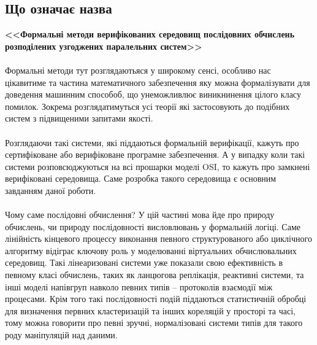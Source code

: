 \documentclass[11pt,oneside]{article}
\begin{document}
\subsection{Що означає назва}

   {\bf <<Формальні методи верифікованих середовищ послідовних
          обчислень розподілених узгоджених паралельних систем>>}

\vspace{0.5cm}

   \paragraph{}
   Формальні методи тут розглядаютьяся у широкому сенсі, особливо нас цікавитиме
   та частина математичного забезпечення яку можна формалізувати для доведення
   машинним способоб, що унеможливлює виникнинення цілого класу помилок.
   Зокрема розглядатимуться усі теорії які застосовують до подібних систем
   з підвищеними запитами якості.

   \paragraph{}
   Розглядаючи такі системи, які піддаються формальній верифікації, кажуть про
   сертифіковане або верифіковане програмне забезпечення. А у випадку коли такі
   системи розповсюджуються на всі прошарки моделі OSI, то кажуть про замкнені
   верифіковані середовища. Саме розробка такого середовища є основним завданням даної роботи.

   \paragraph{}
   Чому саме послідовні обчислення? У цій частині мова йде про природу обчислень,
   чи природу послідовності висловлювань у формальній логіці. Саме лінійність кінцевого
   процессу виконання певного структурованого або циклічного алгоритму відіграє ключову
   роль у моделюванні віртуальних обчислювальних середовищ. Такі лінеаризовані системи
   уже показали свою ефективність в певному класі обчислень, таких як ланцюгова реплікація,
   реактивні системи, та інші моделі напівгруп навколо певних типів -- протоколів взаємодії між процесами.
   Крім того такі послідовності подій піддаються статистичній обробці для визначення первних кластеризацій
   та інших кореляцій у просторі та часі, тому можна говорити про певні зручні, нормалізовані системи типів для
   такого роду маніпуляцій над даними.
\end{document}
